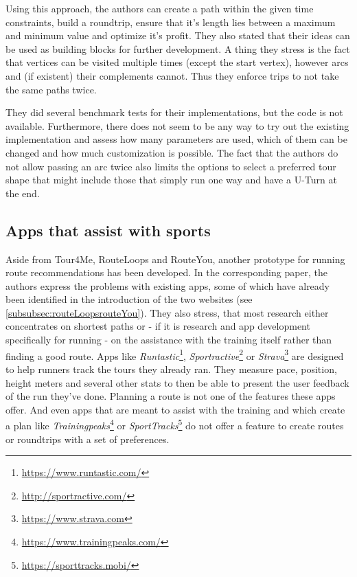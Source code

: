 Using this approach, the authors can create a path within the given time constraints, build a roundtrip, ensure that it's length lies between a maximum and minimum value and optimize it's profit.
They also stated that their ideas can be used as \glqq building blocks\grqq{} for further development.
A thing they stress is the fact that vertices can be visited multiple times (except the start vertex), however arcs and (if existent) their complements cannot. 
Thus they enforce trips to not take the same paths twice. \cite{verbeeck_extension_2014}

They did several benchmark tests for their implementations, but the code is not available.
Furthermore, there does not seem to be any way to try out the existing implementation and assess how many parameters are used, which of them can be changed and how much customization is possible.
The fact that the authors do not allow passing an arc twice also limits the options to select a preferred tour shape that might include those that simply run one way and have a U-Turn at the end. 



\subsection{Apps that assist with sports}
\label{subsec:runningApps}

Aside from Tour4Me, RouteLoops and RouteYou, another prototype for running route recommendations has been developed.
In the corresponding paper\cite{loepp_recommending_nodate}, the authors express the problems with existing apps, some of which have already been identified in the introduction of the two websites (see \ref{subsubsec:routeLoopsrouteYou}).
They also stress, that most research either concentrates on shortest paths or - if it is research and app development specifically for running - on the assistance with the training itself rather than finding a good route.
Apps like \textit{Runtastic}\footnote{\url{https://www.runtastic.com/}}, \textit{Sportractive}\footnote{\url{http://sportractive.com/}} or \textit{Strava}\footnote{\url{https://www.strava.com}} are designed to help runners track the tours they already ran. 
They measure pace, position, height meters and several other stats to then be able to present the user feedback of the run they've done. 
Planning a route is not one of the features these apps offer.
And even apps that are meant to assist with the training and which create a plan like \textit{Trainingpeaks}\footnote{\url{https://www.trainingpeaks.com/}} or \textit{SportTracks}\footnote{\url{https://sporttracks.mobi/}} do not offer a feature to create routes or roundtrips with a set of preferences\cite{loepp_recommending_nodate}.

